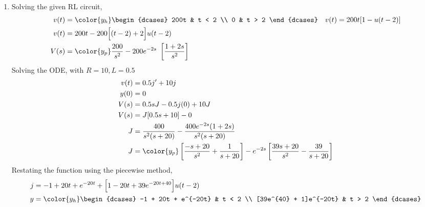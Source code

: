\begin{enumerate}
    \item Solving the given RL circuit,
          \begin{align}
              v(t) & = \color{y_h}\begin{dcases}
                                      200t & t < 2 \\
                                      0    & t > 2
                                  \end{dcases}                                &
              v(t) & = 200t [1 - u(t-2)]                                        \\
              v(t) & = 200t - 200\Big[ (t-2) + 2 \Big]u(t-2)                    \\
              V(s) & = \color{y_p} \frac{200}{s^2} - 200e^{-2s}\ \left[ \frac{1
                      + 2s}{s^2} \right]
          \end{align}
          Solving the ODE, with $ R = 10, L = 0.5 $
          \begin{align}
              v(t) & = 0.5j' + 10j                                                   \\
              y(0) & = 0                                                             \\
              V(s) & = 0.5sJ - 0.5j(0) + 10J                                         \\
              V(s) & = J[0.5s + 10] - 0                                              \\
              J    & = \frac{400}{s^2(s+20)} - \frac{400e^{-2s}(1+2s)}
              {s^2(s+20)}                                                            \\
              J    & = \color{y_p} \left[ \frac{-s+20}{s^2} + \frac{1}{s+20} \right]
              - e^{-2s}\left[ \frac{39s + 20}{s^2} - \frac{39}{s+20} \right]
          \end{align}
          Restating the function using the piecewise method,
          \begin{align}
              j & = -1 + 20t + e^{-20t} + \Big[ 1 - 20t + 39e^{-20t + 40} \Big]u(t-2) \\
              y & = \color{y_h}
              \begin{dcases}
                  -1 + 20t + e^{-20t}    & t < 2 \\
                  [39e^{40} + 1]e^{-20t} & t > 2
              \end{dcases}
          \end{align}


\end{enumerate}
